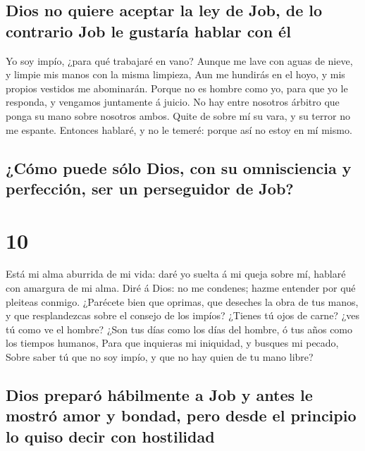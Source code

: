 \hypertarget{dios-no-quiere-aceptar-la-ley-de-job-de-lo-contrario-job-le-gustaruxeda-hablar-con-uxe9l}{%
\subsection{Dios no quiere aceptar la ley de Job, de lo contrario Job le
gustaría hablar con
él}\label{dios-no-quiere-aceptar-la-ley-de-job-de-lo-contrario-job-le-gustaruxeda-hablar-con-uxe9l}}

 Yo soy impío, ¿para qué trabajaré en vano?
 Aunque me lave con aguas de nieve, y limpie mis manos
con la misma limpieza,  Aun me hundirás en el hoyo, y mis
propios vestidos me abominarán.  Porque no es hombre como
yo, para que yo le responda, y vengamos juntamente á juicio.
 No hay entre nosotros árbitro que ponga su mano sobre
nosotros ambos.  Quite de sobre mí su vara, y su terror
no me espante.  Entonces hablaré, y no le temeré: porque
así no estoy en mí mismo.

\hypertarget{cuxf3mo-puede-suxf3lo-dios-con-su-omnisciencia-y-perfecciuxf3n-ser-un-perseguidor-de-job}{%
\subsection{¿Cómo puede sólo Dios, con su omnisciencia y perfección, ser
un perseguidor de
Job?}\label{cuxf3mo-puede-suxf3lo-dios-con-su-omnisciencia-y-perfecciuxf3n-ser-un-perseguidor-de-job}}

\hypertarget{section-9}{%
\section{10}\label{section-9}}

 Está mi alma aburrida de mi vida: daré yo suelta á mi
queja sobre mí, hablaré con amargura de mi alma.  Diré á
Dios: no me condenes; hazme entender por qué pleiteas conmigo.
 ¿Parécete bien que oprimas, que deseches la obra de tus
manos, y que resplandezcas sobre el consejo de los impíos?
 ¿Tienes tú ojos de carne? ¿ves tú como ve el hombre?
 ¿Son tus días como los días del hombre, ó tus años como
los tiempos humanos,  Para que inquieras mi iniquidad, y
busques mi pecado,  Sobre saber tú que no soy impío, y que
no hay quien de tu mano libre?

\hypertarget{dios-preparuxf3-huxe1bilmente-a-job-y-antes-le-mostruxf3-amor-y-bondad-pero-desde-el-principio-lo-quiso-decir-con-hostilidad}{%
\subsection{Dios preparó hábilmente a Job y antes le mostró amor y
bondad, pero desde el principio lo quiso decir con
hostilidad}\label{dios-preparuxf3-huxe1bilmente-a-job-y-antes-le-mostruxf3-amor-y-bondad-pero-desde-el-principio-lo-quiso-decir-con-hostilidad}}

